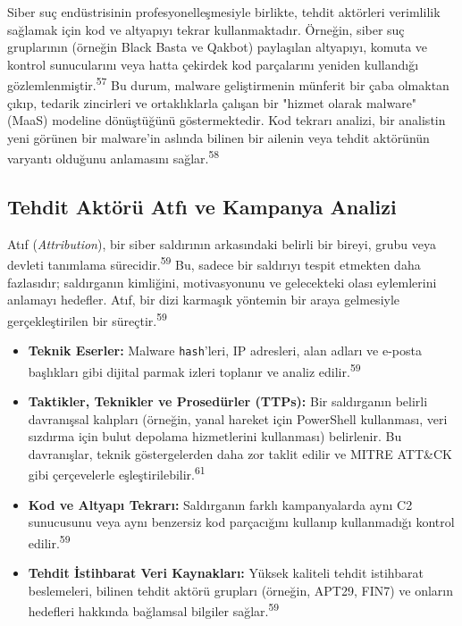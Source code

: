 Siber suç endüstrisinin profesyonelleşmesiyle birlikte, tehdit aktörleri verimlilik sağlamak için kod ve altyapıyı tekrar kullanmaktadır. Örneğin, siber suç gruplarının (örneğin Black Basta ve Qakbot) paylaşılan altyapıyı, komuta ve kontrol sunucularını veya hatta çekirdek kod parçalarını yeniden kullandığı gözlemlenmiştir.\textsuperscript{57} Bu durum, malware geliştirmenin münferit bir çaba olmaktan çıkıp, tedarik zincirleri ve ortaklıklarla çalışan bir "hizmet olarak malware" (MaaS) modeline dönüştüğünü göstermektedir. Kod tekrarı analizi, bir analistin yeni görünen bir malware'in aslında bilinen bir ailenin veya tehdit aktörünün varyantı olduğunu anlamasını sağlar.\textsuperscript{58}

\subsection{Tehdit Aktörü Atfı ve Kampanya Analizi}

Atıf (\textit{Attribution}), bir siber saldırının arkasındaki belirli bir bireyi, grubu veya devleti tanımlama sürecidir.\textsuperscript{59} Bu, sadece bir saldırıyı tespit etmekten daha fazlasıdır; saldırganın kimliğini, motivasyonunu ve gelecekteki olası eylemlerini anlamayı hedefler. Atıf, bir dizi karmaşık yöntemin bir araya gelmesiyle gerçekleştirilen bir süreçtir.\textsuperscript{59}

\begin{itemize}
    \item \textbf{Teknik Eserler:} Malware \texttt{hash}'leri, IP adresleri, alan adları ve e-posta başlıkları gibi dijital parmak izleri toplanır ve analiz edilir.\textsuperscript{59}
    \item \textbf{Taktikler, Teknikler ve Prosedürler (TTPs):} Bir saldırganın belirli davranışsal kalıpları (örneğin, yanal hareket için PowerShell kullanması, veri sızdırma için bulut depolama hizmetlerini kullanması) belirlenir. Bu davranışlar, teknik göstergelerden daha zor taklit edilir ve MITRE ATT\&CK gibi çerçevelerle eşleştirilebilir.\textsuperscript{61}
    \item \textbf{Kod ve Altyapı Tekrarı:} Saldırganın farklı kampanyalarda aynı C2 sunucusunu veya aynı benzersiz kod parçacığını kullanıp kullanmadığı kontrol edilir.\textsuperscript{59}
    \item \textbf{Tehdit İstihbarat Veri Kaynakları:} Yüksek kaliteli tehdit istihbarat beslemeleri, bilinen tehdit aktörü grupları (örneğin, APT29, FIN7) ve onların hedefleri hakkında bağlamsal bilgiler sağlar.\textsuperscript{59}
\end{itemize}

